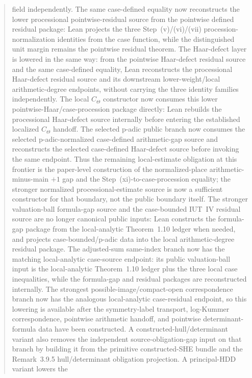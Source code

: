 \documentclass[11pt]{article}
\theoremstyle{plain}
\theoremstyle{definition}
\theoremstyle{remark}
\begin{document}
\begin{abstract}
field independently.  The same case-defined equality now reconstructs the lower
processional pointwise-residual source from the pointwise defined residual
package: Lean projects the three Step~(v)/(vi)/(vii)
procession-normalization identities from the case function, while the
distinguished unit margin remains the pointwise residual theorem.  The
Haar-defect layer is lowered in the same way: from the pointwise Haar-defect
residual source and the same case-defined equality, Lean reconstructs the
processional Haar-defect residual source and its downstream lower-weight/local
arithmetic-degree endpoints, without carrying the three identity families
independently.  The local \(C_\Theta\) constructor now consumes this lower
pointwise-Haar/case-procession package directly: Lean rebuilds the
processional Haar-defect source internally before entering the established
localized \(C_\Theta\) handoff.  The selected p-adic public branch now
consumes the selected p-adic-normalized case-defined arithmetic-gap source and
reconstructs the selected case-defined Haar-defect source before invoking the
same endpoint.  Thus the remaining local-estimate obligation at this frontier
is the paper-level construction of the normalized-place
arithmetic-minus-main \(+1\) gap and the Step~(xi)-to-case-procession equality;
the stronger normalized processional-estimate source is now a sufficient
constructor for that boundary, not the public boundary itself.  The
stronger valuation-ball formula-gap
source and the case-bounded IUT~IV residual source are no longer canonical
public inputs: Lean constructs the formula-gap package from the local-analytic
Theorem~1.10 ledger when needed, and projects case-bounded/p-adic data into the
local arithmetic-degree residual package.  The adjusted-sum same-index branch
now has the matching local-analytic case-source endpoint: its public
valuation-ball input is the local-analytic Theorem~1.10 ledger plus the three
local case inequalities, while the formula-gap and residual packages are
reconstructed internally.  The strongest possible-image/compact-open
correspondence branch now has the analogous local-analytic case-residual
endpoint, so this lowering is available after the symmetry-label transport,
log-Kummer correspondence, pointwise arithmetic handoff, and pointwise
determinant-formula data have been constructed.  A constructed-hull/determinant
variant also removes the independent source-obligation-gap input on that branch
by building it from the primitive constructed-SHE bundle and the Remark~3.9.5
hull/determinant obligation projection.  A principal-HDD variant lowers the

\end{abstract}
\end{document}
